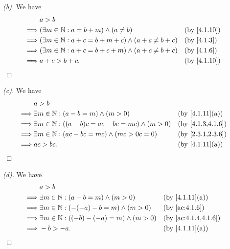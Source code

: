 \begin{proof}[(b)]
  We have
  \begin{align*}
             & a > b                                                                            \\
    \implies & (\exists m \in \N : a = b + m) \land (a \neq b)                 &  & \by{4.1.10} \\
    \implies & (\exists m \in \N : a + c = b + m + c) \land (a + c \neq b + c) &  & \by{4.1.3}  \\
    \implies & (\exists m \in \N : a + c = b + c + m) \land (a + c \neq b + c) &  & \by{4.1.6}  \\
    \implies & a + c > b + c.                                                  &  & \by{4.1.10}
  \end{align*}
\end{proof}

\begin{proof}[(c)]
  We have
  \begin{align*}
             & a > b                                                                            \\
    \implies & \exists m \in \N : (a - b = m) \land (m > 0)               &  & \by{4.1.11}[a]   \\
    \implies & \exists m \in \N : ((a - b)c = ac - bc = mc) \land (m > 0) &  & \by{4.1.3,4.1.6} \\
    \implies & \exists m \in \N : (ac - bc = mc) \land (mc > 0c = 0)      &  & \by{2.3.1,2.3.6} \\
    \implies & ac > bc.                                                   &  & \by{4.1.11}[a]
  \end{align*}
\end{proof}

\begin{proof}[(d)]
  We have
  \begin{align*}
             & a > b                                                                       \\
    \implies & \exists m \in \N : (a - b = m) \land (m > 0)       &  & \by{4.1.11}[a]      \\
    \implies & \exists m \in \N : (-(-a) - b = m) \land (m > 0)   &  & \by{ac:4.1.6}       \\
    \implies & \exists m \in \N : ((-b) - (-a) = m) \land (m > 0) &  & \by{ac:4.1.4,4.1.6} \\
    \implies & -b > -a.                                           &  & \by{4.1.11}[a]
  \end{align*}
\end{proof}


